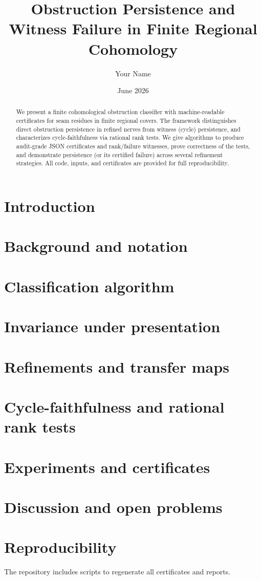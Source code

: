 \documentclass{article}
\title{Obstruction Persistence and Witness Failure in Finite Regional Cohomology}
\author{Your Name}
\date{June 2026}
\begin{document}
\maketitle

\begin{abstract}
We present a finite cohomological obstruction classifier with machine‑readable
certificates for seam residues in finite regional covers. The framework
distinguishes direct obstruction persistence in refined nerves from witness
(cycle) persistence, and characterizes cycle‑faithfulness via rational rank
tests. We give algorithms to produce audit‑grade JSON certificates and
rank/failure witnesses, prove correctness of the tests, and demonstrate
persistence (or its certified failure) across several refinement strategies.
All code, inputs, and certificates are provided for full reproducibility.
\end{abstract}

\section{Introduction}


\section{Background and notation}
\section{Classification algorithm}
\section{Invariance under presentation}
\section{Refinements and transfer maps}
\section{Cycle-faithfulness and rational rank tests}
\section{Experiments and certificates}
\section{Discussion and open problems}
\section*{Reproducibility}
The repository includes scripts to regenerate all certificates and reports.



\end{document}
